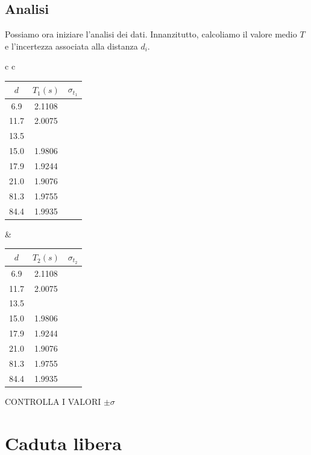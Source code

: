 \subsection{Analisi}
Possiamo ora iniziare l'analisi dei dati. Innanzitutto, calcoliamo il valore medio $T$ e l'incertezza associata alla distanza $d_i$.


\begin{center}
\begin{tabular}{c   c}
\begin{tabular}{c|c|c}
$d$ & $T_1(s)$ & $\sigma_{t_1}$ \\
\midrule
6.9 & 2.1108 &\\
11.7 & 2.0075 &\\
13.5 & &\\
15.0 &  1.9806 &\\
17.9 & 1.9244 &\\
21.0 & 1.9076 &\\
81.3 & 1.9755&\\
84.4 & 1.9935&\\
\end{tabular}
&
\begin{tabular}{c|c|c}
$d$ & $T_2(s)$ & $\sigma_{t_2}$ \\
\midrule
6.9 & 2.1108 &\\
11.7 & 2.0075 &\\
13.5 & &\\
15.0 &  1.9806 &\\
17.9 & 1.9244 &\\
21.0 & 1.9076 &\\
81.3 & 1.9755&\\
84.4 & 1.9935&\\
\end{tabular}
\end{tabular}
\end{center}
CONTROLLA I VALORI
$\pm\sigma$

\section{Caduta libera}


